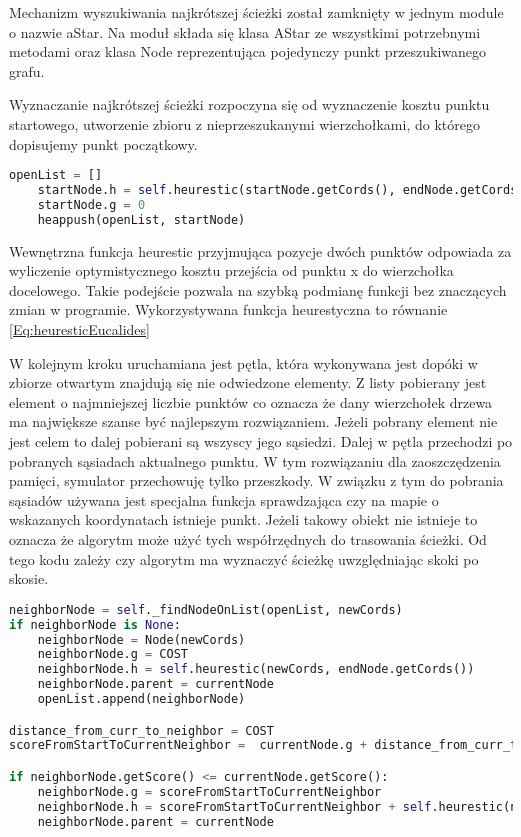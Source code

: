 Mechanizm wyszukiwania najkrótszej ścieżki został zamknięty w jednym module o nazwie aStar.
Na moduł składa się klasa AStar ze wszystkimi potrzebnymi metodami oraz klasa Node reprezentująca 
pojedynczy punkt przeszukiwanego grafu. 

Wyznaczanie najkrótszej ścieżki rozpoczyna się od wyznaczenie kosztu punktu startowego, utworzenie zbioru z nieprzeszukanymi 
wierzchołkami, do którego dopisujemy punkt początkowy. 
\begin{lstlisting}[language=Python,caption=Przygotowanie danych,label={kodPython}]
    openList = []
    startNode.h = self.heurestic(startNode.getCords(), endNode.getCords())
    startNode.g = 0
    heappush(openList, startNode)
\end{lstlisting}

Wewnętrzna funkcja heurestic przyjmująca pozycje dwóch punktów odpowiada
za wyliczenie optymistycznego kosztu przejścia od punktu x do wierzchołka docelowego.
Takie podejście pozwala na szybką podmianę funkcji bez znaczących zmian w programie.
Wykorzystywana funkcja heurestyczna to równanie \eqref{Eq:heuresticEucalides} 

W kolejnym kroku uruchamiana jest pętla, która wykonywana jest dopóki
w zbiorze otwartym znajdują się nie odwiedzone elementy. Z listy pobierany jest 
element o najmniejszej liczbie punktów co oznacza że dany wierzchołek drzewa ma największe szanse być najlepszym rozwiązaniem.
Jeżeli pobrany element nie jest celem to dalej pobierani są wszyscy jego sąsiedzi. 
Dalej w pętla przechodzi po pobranych sąsiadach aktualnego punktu. W tym rozwiązaniu dla zaoszczędzenia pamięci, symulator przechowuję tylko przeszkody.
W związku z tym do pobrania sąsiadów używana jest specjalna funkcja sprawdzająca czy na mapie o wskazanych koordynatach istnieje punkt. 
Jeżeli takowy obiekt nie istnieje to oznacza że algorytm może użyć tych współrzędnych do trasowania ścieżki. 
Od tego kodu zależy czy algorytm ma wyznaczyć ścieżkę uwzględniając skoki po skosie.

\begin{lstlisting}[language=Python,caption=Wyznaczenie kosztu ścieżki,label={kodPython2}]
neighborNode = self._findNodeOnList(openList, newCords)
if neighborNode is None:
    neighborNode = Node(newCords)
    neighborNode.g = COST
    neighborNode.h = self.heurestic(newCords, endNode.getCords())
    neighborNode.parent = currentNode
    openList.append(neighborNode)

distance_from_curr_to_neighbor = COST
scoreFromStartToCurrentNeighbor =  currentNode.g + distance_from_curr_to_neighbor

if neighborNode.getScore() <= currentNode.getScore():
    neighborNode.g = scoreFromStartToCurrentNeighbor
    neighborNode.h = scoreFromStartToCurrentNeighbor + self.heurestic(newCords, endNode.getCords())     
    neighborNode.parent = currentNode
\end{lstlisting}

